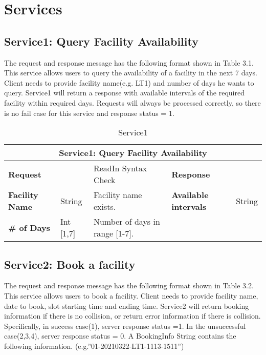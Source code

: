 
\chapter{Services}
\begin{spacing}{1}

\section{Service1: Query Facility Availability}
The request and response message has the following format shown in Table 3.1.\\
This service allows users to query the availability of a facility in the next 7 days. Client needs to provide facility name(e.g. LT1) and number of days he wants to query. Service1 will return a response with available intervals of the required facility within required days.
Requests will always be processed correctly, so there is no fail case for this service and response status = 1.

\begin{table}[h!]
\centering
\begin{tabular}{|l|l|l|l|l|}
\hline
\multicolumn{5}{|c|}{Service1: Query Facility Availability} \\ \hline
\multicolumn{2}{|l|}{\textbf{Request}} & ReadIn Syntax Check & \multicolumn{2}{l|}{\textbf{Response}} \\ \hline
\textbf{Facility Name} & String & Facility name exists. & \textbf{Available intervals} & String \\ \hline
\textbf{\# of Days} & Int {[}1,7{]} & Number of days in range {[}1-7{]}. &  &  \\ \hline
\end{tabular}
\caption{Service1}
\end{table}

\section{Service2: Book a facility}
The request and response message has the following format shown in Table 3.2.\\
This service allows users to book a facility. Client needs to provide facility name, date to book, slot starting time and ending time. Service2 will return booking information if there is no collision, or return error information if there is collision. Specifically, in success case(1), server response status =1. In the unsuccessful case(2,3,4), server response status = 0.
A BookingInfo String contains the following information. (e.g.”01-20210322-LT1-1113-1511”)


\end{spacing}
